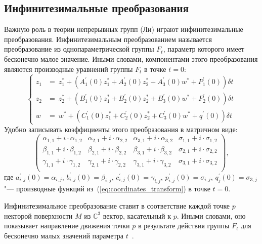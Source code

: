 \documentclass[../main.tex]{subfiles}
\begin{document}
\subsection{Инфинитезимальные преобразования}
Важную роль в теории непрерывных групп (Ли) играют инфинитезимальные преобразования. Инфинитезимальным преобразованием называется преобразование из однопараметрической группы $F_t$, параметр которого имеет бесконечно малое значение. Иными словами, компонентами этого преобразования являются производные уравнений группы $F_t$ в точке $t = 0$:
\begin{equation*}
	\begin{cases}
     z_1 &=~z^*_1 + (A^{\prime}_{1}(0) z_1^* + A^{\prime}_{2}(0) z_2^* + A^{\prime}_{3}(0) w^* + P^{\prime}_1(0))\delta t \\
     z_2 &=~z^*_2 + (B^{\prime}_{1}(0) z_1^* + B^{\prime}_{2}(0) z_2^* + B^{\prime}_{3}(0) w^* + P^{\prime}_2(0))\delta t \\
     w   &=~w^*   + (C^{\prime}_{1}(0) z_1^* + C^{\prime}_{2}(0) z_2^* + C^{\prime}_{3}(0) w^* + q^{\prime}(0))\delta t
  \end{cases}
\end{equation*}
Удобно записывать коэффициенты этого преобразования в матричном виде:
\begin{equation}
\begin{pmatrix}
\alpha_{1,1} + i\cdot\alpha_{1,2} & \alpha_{2,1} + i\cdot\alpha_{2,2} & \alpha_{3,1} + i\cdot\alpha_{3,2} & \sigma_{1,1} + i\cdot\sigma_{1,2} \\
 \beta_{1,1} +  i\cdot\beta_{1,2} &  \beta_{2,1} +  i\cdot\beta_{2,2} &  \beta_{3,1} +  i\cdot\beta_{3,2} & \sigma_{2,1} + i\cdot\sigma_{2,2} \\
\gamma_{1,1} + i\cdot\gamma_{1,2} & \gamma_{2,1} + i\cdot\gamma_{2,2} & \gamma_{3,1} + i\cdot\gamma_{3,2} & \sigma_{3,1} + i\cdot\sigma_{3,2} \\
\end{pmatrix},
\end{equation}
где $a^{\prime}_{i,j}(0) = \alpha_{i,j}$, $b^{\prime}_{i,j}(0) = \beta_{i,j}$, $c^{\prime}_{i,j}(0) = \gamma_{i,j}$, $p^{\prime}_{i,j}(0) = \sigma_{i,j}$, $q^{\prime}_{j}(0) = \sigma_{3,j}$ "--- производные функций из~(\ref{eq:coordinates_transform}) в точке $t = 0$.

Инфинитезимальное преобразование ставит в соответствие каждой точке $p$ некторой поверхности $M$ из $\mathbb{C}^3$ вектор, касательный к $p$. Иными словами, оно показывает направление движения точки $p$ в результате действия группы $F_t$ для бесконечно малых значений параметра $t$~\cite{lie}.
\end{document}
